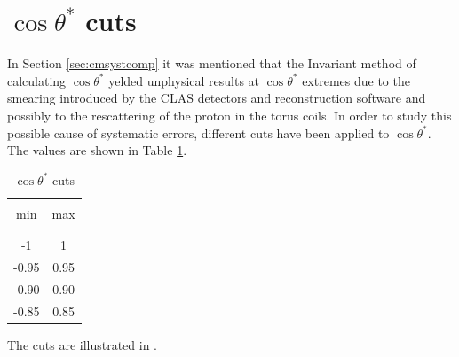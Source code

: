 \cia \vspace{-2cm}
\section{$\cos\theta^*$ cuts}
In Section \ref{sec:cmsystcomp} it was mentioned that the Invariant method of
calculating  $\cos\theta^*$ yelded unphysical results at $\cos\theta^*$ extremes
due to the smearing introduced by the CLAS detectors and reconstruction software and possibly 
to the rescattering of the proton in the torus coils.
In order to study this possible cause of systematic errors, different cuts have been applied
to  $\cos\theta^*$.  The values are shown in  Table \ref{tab:costheta_cuts}.




\begin{table}[h]
 \begin{center}
  \begin{tabular}{c  c}
    & \\
    min &  max   \\ 
    & \\
    \hline
    & \\
    -1     & 1  \\
    -0.95  & 0.95 \\ 
    -0.90  & 0.90  \\
    -0.85  & 0.85 \\
  \end{tabular}
 \end{center} 
 \caption{$\cos\theta^*$  cuts}
 \label{tab:costheta_cuts}
\end{table}


The cuts are illustrated in .


